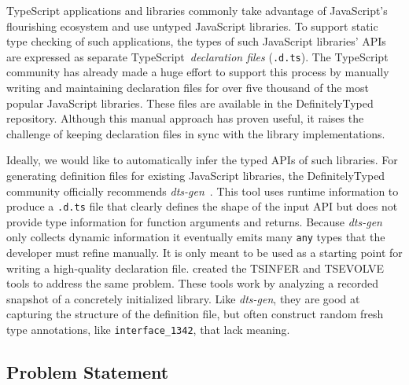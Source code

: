 \documentclass[sigplan,10pt,review,anonymous]{acmart} %
\theoremstyle{plain}
\theoremstyle{remark}
\theoremstyle{definition}
\begin{document}
TypeScript applications and libraries commonly take advantage of JavaScript's flourishing ecosystem
and use untyped JavaScript libraries.
To support static type checking of such applications,
the types of such JavaScript libraries' APIs are expressed
as separate TypeScript~\emph{declaration files} (\lstinline{.d.ts}).
The TypeScript community has already
made a huge effort to support this process by manually writing and maintaining
declaration files for over five thousand of the most popular JavaScript
libraries. These files are available in the 
DefinitelyTyped~\citep{definitelytyped} repository.
Although this manual approach has proven
useful, it raises the challenge of keeping declaration files
in sync with the library implementations.

Ideally, we would like to automatically infer the typed APIs of such libraries.
For generating definition files for existing JavaScript libraries,
the DefinitelyTyped
community officially recommends \textit{dts-gen}~\citep{dtsgen}.
This tool uses runtime information to produce a \lstinline{.d.ts} file that
clearly defines the shape of the input API but does not provide type information for
function arguments and returns. Because \textit{dts-gen} only collects
dynamic information it eventually emits many \texttt{any} types that the developer must refine manually.
It is only meant to be used as a starting
point for writing a high-quality declaration file.
\citet{tstools2017} created the TSINFER and TSEVOLVE tools to address the same problem.
These tools work by analyzing a recorded snapshot of a concretely initialized library.
Like \textit{dts-gen}, they are good at capturing the structure of the definition file,
but often construct random fresh type annotations, like \lstinline{interface_1342}, that lack meaning.

\subsection{Problem Statement}\label{ssec:problem}
% 

\end{document}
